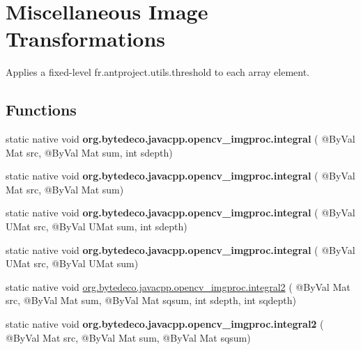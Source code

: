 \hypertarget{group__imgproc__misc}{}\section{Miscellaneous Image Transformations}
\label{group__imgproc__misc}


Applies a fixed-\/level fr.antproject.utils.threshold to each array element.


\subsection*{Functions}
\begin{DoxyCompactItemize}
\item 
\mbox{\label{group__imgproc__misc_gab0098b88cb43ba8e3cc4c2e5b69d7309}} 
static native void {\bfseries org.\+bytedeco.\+javacpp.\+opencv\+\_\+imgproc.\+integral} ( @By\+Val Mat src, @By\+Val Mat sum, int sdepth)
\item 
\mbox{\label{group__imgproc__misc_gaaf7d4b47eeb310303fc4eebfe0fe9ce0}} 
static native void {\bfseries org.\+bytedeco.\+javacpp.\+opencv\+\_\+imgproc.\+integral} ( @By\+Val Mat src, @By\+Val Mat sum)
\item 
\mbox{\label{group__imgproc__misc_gafa36efd2172305ff556e12fdb84d1838}} 
static native void {\bfseries org.\+bytedeco.\+javacpp.\+opencv\+\_\+imgproc.\+integral} ( @By\+Val U\+Mat src, @By\+Val U\+Mat sum, int sdepth)
\item 
\mbox{\label{group__imgproc__misc_ga9b664db83206574b7b96ebadbad58b62}} 
static native void {\bfseries org.\+bytedeco.\+javacpp.\+opencv\+\_\+imgproc.\+integral} ( @By\+Val U\+Mat src, @By\+Val U\+Mat sum)
\item 
static native void \hyperlink{group__imgproc__misc_ga7c3e8cf075507c80c07a1fd8cd8969de}{org.\+bytedeco.\+javacpp.\+opencv\+\_\+imgproc.\+integral2} ( @By\+Val Mat src, @By\+Val Mat sum, @By\+Val Mat sqsum, int sdepth, int sqdepth)
\item 
\mbox{\label{group__imgproc__misc_gae63ae0ac675b6a1c3c17de7d5afd2bb9}} 
static native void {\bfseries org.\+bytedeco.\+javacpp.\+opencv\+\_\+imgproc.\+integral2} ( @By\+Val Mat src, @By\+Val Mat sum, @By\+Val Mat sqsum)

\end{DoxyCompactItemize}
